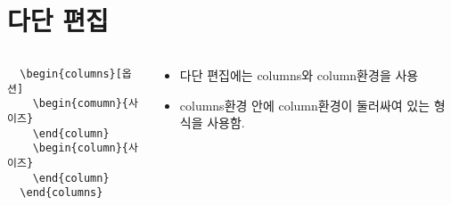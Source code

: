 \documentclass[hyperref={unicode}]{beamer}
\begin{document}
\section{다단 편집}


\begin{frame}[fragile]

\begin{columns}[t]
\begin{column}{0.5\textwidth}
\begin{block}{}
\begin{center}
\begin{verbatim}
  \begin{columns}[옵션]
    \begin{comumn}{사이즈}
    \end{column}
    \begin{column}{사이즈}
    \end{column}
  \end{columns} 
\end{verbatim}
\end{center}
\end{block}%
\end{column}

\begin{column}{0.5\textwidth}
\begin{itemize}
\item 다단 편집에는 columns와 column환경을 사용
\item columns환경 안에 column환경이 둘러싸여 있는 형식을 사용함. 
\end{itemize}

\end{column}

\end{columns}
\end{frame}
\end{document}
